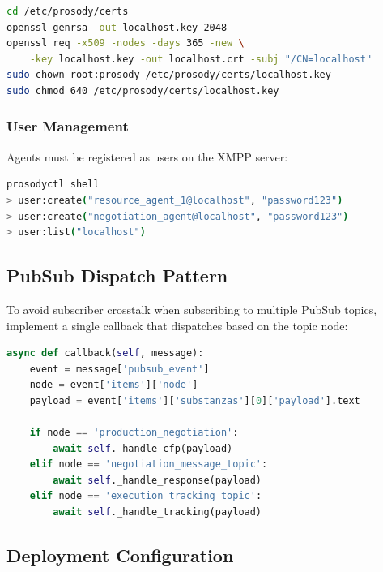 \begin{lstlisting}[language=bash, caption={Certificate Generation}, label={lst:cert_gen}]
cd /etc/prosody/certs
openssl genrsa -out localhost.key 2048
openssl req -x509 -nodes -days 365 -new \
    -key localhost.key -out localhost.crt -subj "/CN=localhost"
sudo chown root:prosody /etc/prosody/certs/localhost.key
sudo chmod 640 /etc/prosody/certs/localhost.key
\end{lstlisting}

\subsubsection{User Management}

Agents must be registered as users on the \ac{XMPP} server:

\begin{lstlisting}[language=bash, caption={XMPP User Creation}, label={lst:user_create}]
prosodyctl shell
> user:create("resource_agent_1@localhost", "password123")
> user:create("negotiation_agent@localhost", "password123")
> user:list("localhost")
\end{lstlisting}

\subsection{PubSub Dispatch Pattern}
\label{app:pubsub_dispatch}

To avoid subscriber crosstalk when subscribing to multiple PubSub topics, implement a single callback that dispatches based on the topic node:

\begin{lstlisting}[language=Python, caption={PubSub Topic Dispatch Pattern}, label={lst:pubsub_dispatch}]
async def callback(self, message):
    event = message['pubsub_event']
    node = event['items']['node']
    payload = event['items']['substanzas'][0]['payload'].text
    
    if node == 'production_negotiation':
        await self._handle_cfp(payload)
    elif node == 'negotiation_message_topic':
        await self._handle_response(payload)
    elif node == 'execution_tracking_topic':
        await self._handle_tracking(payload)
\end{lstlisting}

\subsection{Deployment Configuration}
\label{app:deployment_config}

